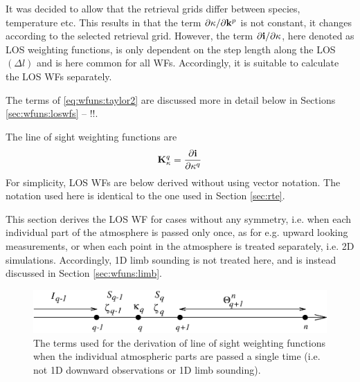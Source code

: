   It was decided to allow that the retrieval grids differ between
  species, temperature etc. This results in that the term $\partial
  \kappa/ \partial \mathbf{k}^p$ is not constant, it changes according to
  the selected retrieval grid. However, the term $\partial\mathbf{i}/
  \partial \kappa$, here denoted as LOS weighting functions, is only
  dependent on the step length along the LOS $(\Delta l)$ and is here
  common for all WFs. Accordingly, it is suitable to calculate the LOS
  WFs separately.
  
  The terms of \ref{eq:wfuns:taylor2} are discussed more in detail
  below in Sections \ref{sec:wfuns:loswfs} -- !!.
  



 \label{sec:wfuns:loswfs}

 The line of sight weighting functions are
 \begin{equation}
   \mathbf{K}_{\kappa}^q =  \frac{\partial\mathbf{i}}{\partial \kappa^q}
  \label{eq:wfuns:loswfs}
 \end{equation}
 For simplicity, LOS WFs are below derived without using vector
 notation. The notation used here is identical to the one used in
 Section \ref{sec:rte}.


 
 This section derives the LOS WF for cases without any symmetry, i.e.
 when each individual part of the atmosphere is passed only once, as
 for e.g. upward looking measurements, or when each point in the
 atmosphere is treated separately, i.e. 2D simulations. Accordingly,
 1D limb sounding is not treated here, and is instead discussed in
 Section \ref{sec:wfuns:limb}.

 \begin{figure}[t]
  \begin{center}
   \includegraphics*[width=0.95\hsize]{Figs/wf1.eps}
   \caption{The terms used for the derivation of line of sight weighting
            functions when the individual atmospheric parts are passed a
            single time (i.e. not 1D downward observations or 1D limb 
            sounding).}
   \label{fig:wfuns:single}  
  \end{center}
 \end{figure}

